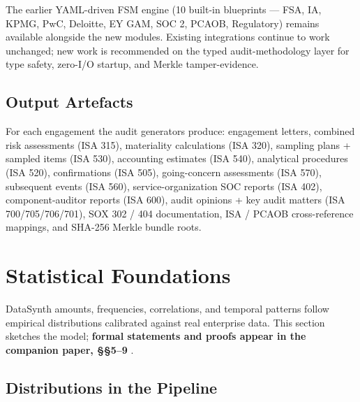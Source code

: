 \documentclass[11pt,a4paper]{article}
\begin{document}
The earlier YAML-driven FSM engine (10 built-in blueprints --- FSA, IA, KPMG,
PwC, Deloitte, EY GAM, SOC 2, PCAOB, Regulatory) remains available alongside
the new modules. Existing integrations continue to work unchanged; new work
is recommended on the typed audit-methodology layer for type safety,
zero-I/O startup, and Merkle tamper-evidence.

\subsection{Output Artefacts}

For each engagement the audit generators produce: engagement letters,
combined risk assessments (ISA 315), materiality calculations (ISA 320),
sampling plans + sampled items (ISA 530), accounting estimates (ISA 540),
analytical procedures (ISA 520), confirmations (ISA 505), going-concern
assessments (ISA 570), subsequent events (ISA 560), service-organization
SOC reports (ISA 402), component-auditor reports (ISA 600),
audit opinions + key audit matters (ISA 700/705/706/701),
SOX 302 / 404 documentation, ISA / PCAOB cross-reference mappings, and
SHA-256 Merkle bundle roots.

\newpage
\section{Statistical Foundations}

DataSynth amounts, frequencies, correlations, and temporal patterns follow
empirical distributions calibrated against real enterprise data. This section
sketches the model; \textbf{formal statements and proofs appear in the
companion paper, \S\S{}5--9} \citep{ivertowski2026datasynth}.

\subsection{Distributions in the Pipeline}
\end{document}
